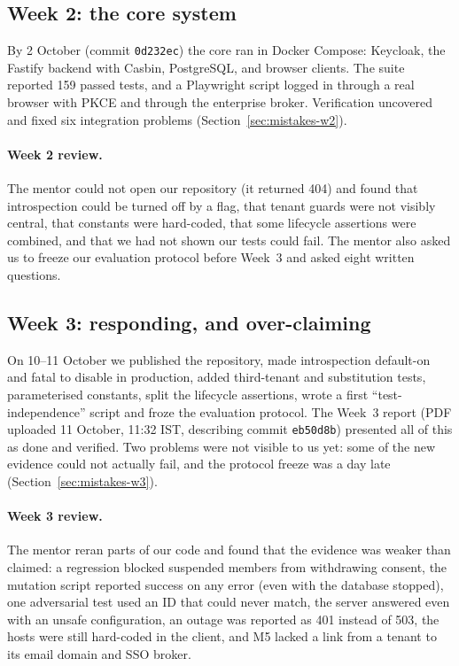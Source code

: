 \subsection{Week 2: the core system}
By 2 October (commit \texttt{0d232ec}) the core ran in Docker Compose: Keycloak, the Fastify backend with Casbin, PostgreSQL, and browser clients. The suite reported 159 passed tests, and a Playwright script logged in through a real browser with PKCE and through the enterprise broker. Verification uncovered and fixed six integration problems (Section~\ref{sec:mistakes-w2}).

\paragraph{Week 2 review.} The mentor could not open our repository (it returned 404) and found that introspection could be turned off by a flag, that tenant guards were not visibly central, that constants were hard-coded, that some lifecycle assertions were combined, and that we had not shown our tests could fail. The mentor also asked us to freeze our evaluation protocol before Week~3 and asked eight written questions.

\subsection{Week 3: responding, and over-claiming}
On 10--11 October we published the repository, made introspection default-on and fatal to disable in production, added third-tenant and substitution tests, parameterised constants, split the lifecycle assertions, wrote a first ``test-independence'' script and froze the evaluation protocol. The Week~3 report (PDF uploaded 11 October, 11:32 IST, describing commit \texttt{eb50d8b}) presented all of this as done and verified. Two problems were not visible to us yet: some of the new evidence could not actually fail, and the protocol freeze was a day late (Section~\ref{sec:mistakes-w3}).

\paragraph{Week 3 review.} The mentor reran parts of our code and found that the evidence was weaker than claimed: a regression blocked suspended members from withdrawing consent, the mutation script reported success on any error (even with the database stopped), one adversarial test used an ID that could never match, the server answered  even with an unsafe configuration, an outage was reported as 401 instead of 503, the hosts were still hard-coded in the client, and M5 lacked a link from a tenant to its email domain and SSO broker.

